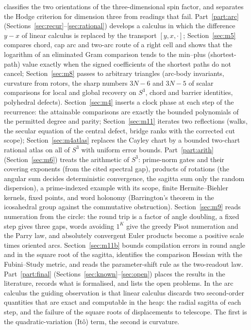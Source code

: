 \documentclass[11pt,reqno]{amsart}
\theoremstyle{definition}
\theoremstyle{remark}
\numberwithin{equation}{section}
\newcommand{\hp}[3]{[#1,#2,#3]}
\begin{document}
classifies the two orientations of the three-dimensional spin factor, and separates the Hodge criterion for dimension three from
readings that fail.  Part~\ref{part:arc} (Sections~\ref{sec:recur}--\ref{sec:rational}) develops a
calculus in which the difference $y-x$ of linear calculus is replaced by the transport $\hp y x\cdot$; Section~\ref{sec:m5} compares
chord, cap arc and two-arc route of a right cell and shows that the logarithm of an eliminated Gram comparison tends to the min--plus
(shortest-path) value exactly when the signed coefficients of the shortest paths do not cancel; Section~\ref{sec:m8} passes to arbitrary
triangles (arc-body invariants, curvature from rotors, the sharp numbers $3N-6$ and $3N-5$ of scalar comparisons for local and global
recovery on $S^3$, chord and barrier identities, polyhedral defects).  Section~\ref{sec:m4} inserts a clock
phase at each step of the recurrence: the attainable comparisons are exactly the bounded polynomials of the permitted degree and parity;
Section~\ref{sec:m11} iterates two reflections (walks, the secular equation of the central defect, bridge ranks with the corrected
cut scope);
Section~\ref{sec:m4atlas} replaces the Cayley chart by a bounded two-chart rational atlas on all of $S^3$ with uniform error bounds.
Part~\ref{part:arith} (Section~\ref{sec:m6}) treats the arithmetic of $S^3$: prime-norm gates and their covering exponents (from the
cited spectral gap), products of rotations (the angular sum decides deterministic convergence, the sagitta sum only the random
dispersion), a prime-indexed example with its scope, finite Hermite--Biehler kernels, fixed points, and word holonomy (Barrington's
theorem in the icosahedral group against the commutative obstruction).  Section~\ref{sec:m9} reads numeration from the circle: the round
trip is a factor of angle doubling, a fixed step gives three gaps, words avoiding $1^K$ give the greedy Pisot numeration and the Parry
law, and absolutely convergent Euler products become a positive scale times oriented arcs.  Section~\ref{sec:m11b} bounds compilation
errors in round angle and in the square root of the sagitta, identifies the comparison Hessian with the Fubini--Study metric, and
reads the parameter-shift rule as the two-readout law.  Part~\ref{part:final}
(Sections~\ref{sec:known}--\ref{sec:open}) places the results in the literature, records what is formalised, and lists the open problems.
In the arc calculus the guiding observation is that linear calculus discards two second-order quantities
that are exact and computable in the heap: the radial sagitta of each step, and the failure of the
square roots of displacements to telescope.  The first is the quadratic-variation (It\^o) term, the
second is curvature.
\end{document}

